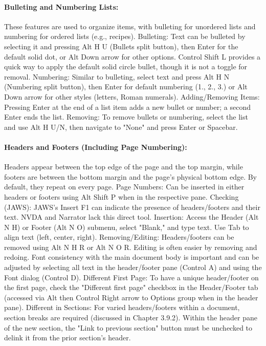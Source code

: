 \paragraph{Bulleting and Numbering Lists:}
These features are used to organize items, with bulleting for unordered lists and numbering for ordered lists (e.g., recipes).
Bulleting: Text can be bulleted by selecting it and pressing Alt H U (Bullets split button), then Enter for the default solid dot, or Alt Down arrow for other options. Control Shift L provides a quick way to apply the default solid circle bullet, though it is not a toggle for removal.\supercite{kingsbury2025}
Numbering: Similar to bulleting, select text and press Alt H N (Numbering split button), then Enter for default numbering (1., 2., 3.) or Alt Down arrow for other styles (letters, Roman numerals).\supercite{kingsbury2025}
Adding/Removing Items: Pressing Enter at the end of a list item adds a new bullet or number; a second Enter ends the list.\supercite{kingsbury2025}
Removing: To remove bullets or numbering, select the list and use Alt H U/N, then navigate to "None" and press Enter or Spacebar.\supercite{kingsbury2025}
\paragraph{Headers and Footers (Including Page Numbering):}
Headers appear between the top edge of the page and the top margin, while footers are between the bottom margin and the page's physical bottom edge. By default, they repeat on every page.\supercite{kingsbury2025}
Page Numbers: Can be inserted in either headers or footers using Alt Shift P when in the respective pane.\supercite{kingsbury2025}
Checking (JAWS): JAWS's Insert F1 can indicate the presence of headers/footers and their text.\supercite{kingsbury2025} NVDA and Narrator lack this direct tool.\supercite{kingsbury2025}
Insertion: Access the Header (Alt N H) or Footer (Alt N O) submenu, select "Blank," and type text. Use Tab to align text (left, center, right).\supercite{kingsbury2025}
Removing/Editing: Headers/footers can be removed using Alt N H R or Alt N O R. Editing is often easier by removing and redoing.\supercite{kingsbury2025} Font consistency with the main document body is important and can be adjusted by selecting all text in the header/footer pane (Control A) and using the Font dialog (Control D).\supercite{kingsbury2025}
Different First Page: To have a unique header/footer on the first page, check the "Different first page" checkbox in the Header/Footer tab (accessed via Alt then Control Right arrow to Options group when in the header pane).\supercite{kingsbury2025}
Different in Sections: For varied headers/footers within a document, section breaks are required (discussed in Chapter 3.9.2). Within the header pane of the new section, the "Link to previous section" button must be unchecked to delink it from the prior section's header.\supercite{kingsbury2025}
